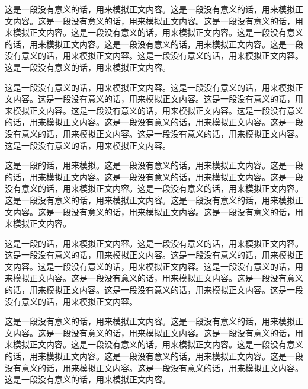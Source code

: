 
这是一段没有意义的话，用来模拟正文内容。这是一段没有意义的话，用来模拟正文内容。这是一段没有意义的话，用来模拟正文内容。这是一段没有意义的话，用来模拟正文内容。这是一段没有意义的话，用来模拟正文内容。这是一段没有意义的话，用来模拟正文内容。这是一段没有意义的话，用来模拟正文内容。这是一段没有意义的话，用来模拟正文内容。这是一段没有意义的话，用来模拟正文内容。这是一段没有意义的话，用来模拟正文内容。




这是一段没有意义的话，用来模拟正文内容。这是一段没有意义的话，用来模拟正文内容。这是一段没有意义的话，用来模拟正文内容。这是一段没有意义的话，用来模拟正文内容。这是一段没有意义的话，用来模拟正文内容。这是一段没有意义的话，用来模拟正文内容。这是一段没有意义的话，用来模拟正文内容。这是一段没有意义的话，用来模拟正文内容。这是一段没有意义的话，用来模拟正文内容。这是一段没有意义的话，用来模拟正文内容。



这是一段的话，用来模拟。这是一段没有意义的话，用来模拟正文内容。这是一段的话，用来模拟正文内容。这是一段没有意义的话，用来模拟正文内容。这是一段没有意义的话，用来模拟正文内容。这是一段没有意义的话，用来模拟正文内容。这是一段没有意义的话，用来模拟正文内容。这是一段没有意义的话，用来模拟正文内容。这是一段没有意义的话，用来模拟正文内容。这是一段没有意义的话，用来模拟正文内容。

这是一段的话，用来模拟正文内容。这是一段没有意义的话，用来模拟正文内容。这是一段没有意义的话，用来模拟正文内容。这是一段没有意义的话，用来模拟正文内容。这是一段没有意义的话，用来模拟正文内容。这是一段没有意义的话，用来模拟正文内容。这是一段没有意义的话，用来模拟正文内容。这是一段没有意义的话，用来模拟正文内容。这是一段没有意义的话，用来模拟正文内容。这是一段没有意义的话，用来模拟正文内容。

这是一段没有意义的话，用来模拟正文内容。这是一段没有意义的话，用来模拟正文内容。这是一段没有意义的话，用来模拟正文内容。这是一段没有意义的话，用来模拟正文内容。这是一段没有意义的话，用来模拟正文内容。这是一段没有意义的话，用来模拟正文内容。这是一段没有意义的话，用来模拟正文内容。这是一段没有意义的话，用来模拟正文内容。这是一段没有意义的话，用来模拟正文内容。这是一段没有意义的话，用来模拟正文内容。

